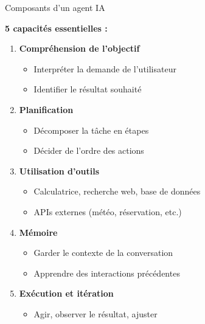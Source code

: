 \begin{frame}{Composants d'un agent IA}

\textbf{5 capacités essentielles :}

\vspace{0.3cm}

\begin{enumerate}
    \item<+-> \textbf{Compréhension de l'objectif}
        \begin{itemize}
            \item Interpréter la demande de l'utilisateur
            \item Identifier le résultat souhaité
        \end{itemize}
    
    \item<+-> \textbf{Planification}
        \begin{itemize}
            \item Décomposer la tâche en étapes
            \item Décider de l'ordre des actions
        \end{itemize}
    
    \item<+-> \textbf{Utilisation d'outils}
        \begin{itemize}
            \item Calculatrice, recherche web, base de données
            \item APIs externes (météo, réservation, etc.)
        \end{itemize}
    
    \item<+-> \textbf{Mémoire}
        \begin{itemize}
            \item Garder le contexte de la conversation
            \item Apprendre des interactions précédentes
        \end{itemize}
    
    \item<+-> \textbf{Exécution et itération}
        \begin{itemize}
            \item Agir, observer le résultat, ajuster
        \end{itemize}
\end{enumerate}

\end{frame}

